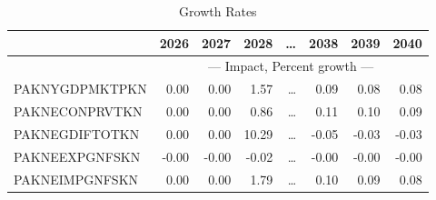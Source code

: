 \documentclass{article}
\begin{document}
\begin{table}[ht]
\caption{Growth Rates}
\begin{tabular}{lrrrrrrr}
\toprule
 & 2026 & 2027 & 2028 & \dots & 2038 & 2039 & 2040 \\
\midrule
&\multicolumn{7}{c}{{--- Impact, Percent growth ---}}                                  \\
PAKNYGDPMKTPKN & 0.00 & 0.00 & 1.57 & \dots & 0.09 & 0.08 & 0.08 \\
PAKNECONPRVTKN & 0.00 & 0.00 & 0.86 & \dots & 0.11 & 0.10 & 0.09 \\
PAKNEGDIFTOTKN & 0.00 & 0.00 & 10.29 & \dots & -0.05 & -0.03 & -0.03 \\
PAKNEEXPGNFSKN & -0.00 & -0.00 & -0.02 & \dots & -0.00 & -0.00 & -0.00 \\
PAKNEIMPGNFSKN & 0.00 & 0.00 & 1.79 & \dots & 0.10 & 0.09 & 0.08 \\
\bottomrule
\end{tabular}
\end{table}
\end{document}
